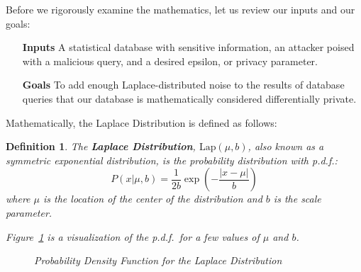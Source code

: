 \documentclass[conference,11pt]{IEEEtran}
\newtheorem{definition}{Definition}
\begin{document}
Before we rigorously examine the mathematics, let us review our inputs and our
goals:

\begin{itemize}[leftmargin=4em]
    \item [\textbf{Inputs}] A statistical database with sensitive information,
        an attacker poised with a malicious query, and a desired epsilon, or
        privacy parameter.

    \item [\textbf{Goals}] To add enough Laplace-distributed noise to the
        results of database queries that our database is mathematically
        considered differentially private.
\end{itemize}

Mathematically, the Laplace Distribution is defined as follows:
\begin{mdframed}
    \begin{definition}\label{def:laplace}
        The \textbf{Laplace Distribution}, $\text{Lap}(\mu, b)$, also known as a
        symmetric exponential distribution, is the probability distribution with
        p.d.f.:
        \begin{equation}
            P(x|\mu, b) = \frac{1}{2b}\exp\left(-\frac{|x - \mu|}{b}\right)
        \end{equation}
        where $\mu$ is the location of the center of the distribution and $b$ is
        the scale parameter.

        Figure~\ref{fig:laplace-pdf} is a visualization of the p.d.f.\ for a few
        values of $\mu$ and $b$.\\

        \begin{figure}[H]
            \caption{Probability Density Function for the Laplace Distribution}
            \label{fig:laplace-pdf}
        \end{figure}
    \end{definition}
\end{mdframed}
\end{document}
